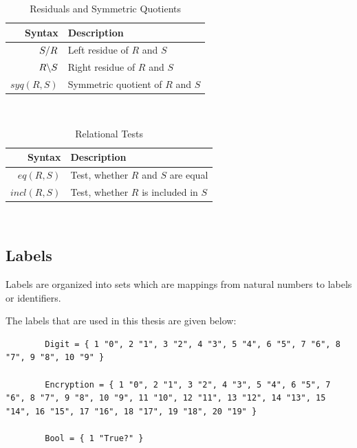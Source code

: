 \begin{table}[ht]
\label{tbl:residual_ops}
	\centering
	\begin{tabular}{|r|l|}
		\hline
		Syntax & Description \\ \hline \hline
		${S}/{R}$ & Left residue\index{residue!left residue} of $R$ and $S$ \\ 
		${R}\backslash{S}$ & Right residue\index{residue!right residue} of $R$ and $S$ \\  
		$syq(R,S)$ & Symmetric quotient\index{symmetric quotient} of $R$ and $S$ \\  \hline 
	\end{tabular}
	\caption{Residuals and Symmetric Quotients}					
\end{table} ~

\begin{table}[ht]
\label{tbl:test_ops}
	\centering
	\begin{tabular}{|r|l|}
		\hline
		Syntax & Description \\ \hline \hline
		$eq(R,S)$ &  Test, whether $R$ and $S$ are equal \\ 
		$incl(R,S)$ &  Test, whether $R$ is included in $S$ \\  \hline 
	\end{tabular}
	\caption{Relational Tests}					
\end{table}~


\subsection{Labels}
\label{sub:labels}

	Labels are organized into sets which are mappings from natural numbers to labels or identifiers. \newline
	
	The labels that are used in this thesis are given below: \newline
	
	\begin{lstlisting}
		Digit = { 1 "0", 2 "1", 3 "2", 4 "3", 5 "4", 6 "5", 7 "6", 8 "7", 9 "8", 10 "9" }
		
		Encryption = { 1 "0", 2 "1", 3 "2", 4 "3", 5 "4", 6 "5", 7 "6", 8 "7", 9 "8", 10 "9", 11 "10", 12 "11", 13 "12", 14 "13", 15 "14", 16 "15", 17 "16", 18 "17", 19 "18", 20 "19" }
		
		Bool = { 1 "True?" }
	\end{lstlisting}
	~
	
